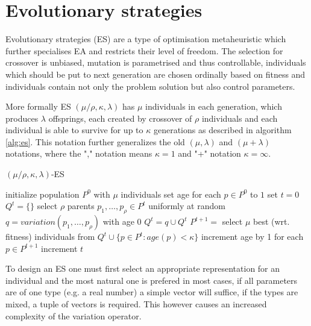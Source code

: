 \section{Evolutionary strategies}
\label{sec:es}
Evolutionary strategies (ES) are a type of optimisation metaheuristic which further specialises EA and restricts their level of freedom. The selection for crossover is unbiased, mutation is parametrised and thus controllable, individuals which should be put to next generation are chosen ordinally based on fitness and individuals contain not only the problem solution but also control parameters.

More formally ES $(\mu / \rho,\kappa,\lambda)$ has $\mu$ individuals in each generation, which produces $\lambda$ offsprings, each created by crossover of $\rho$ individuals and each individual is able to survive for up to $\kappa$ generations as described in algorithm \ref{alg:es}. This notation further generalizes the old $(\mu,\lambda)$ and $(\mu+\lambda)$ notations, where the "," notation means $\kappa=1$ and "+" notation $\kappa=\infty$. 
\begin{algorithm}
\begin{algorithmic}[1]
\caption{$(\mu / \rho,\kappa,\lambda)$-ES}
\label{alg:es}
    \State initialize population $P^0$ with $\mu$ individuals
    \State set age for each $p\in P^0$ to $1$
    \State set $t=0$
    \Repeat
        \State $Q^t = \{\}$
            \State select $\rho$ parents $p_1,\dots,p_\rho \in P^t$ uniformly at random
            \State $q = variation(p_1,\dots,p_\rho)$ with age $0$
            \State $Q^t = q \cup Q^t$
        \EndFor
        \State $P^{t+1} =$ select $\mu$ best (wrt. fitness) individuals from $Q^t\cup \{p \in P^t: age(p)<\kappa\}$
        \State increment age by 1 for each $p \in P^{t+1}$
        \State increment $t$
\end{algorithmic}
\end{algorithm}

To design an ES one must first select an appropriate representation for an individual and the most natural one is prefered in most cases, if all parameters are of one type (e.g. a real number) a simple vector will suffice, if the types are mixed, a tuple of vectors is required. This however causes an increased complexity of the variation operator.

